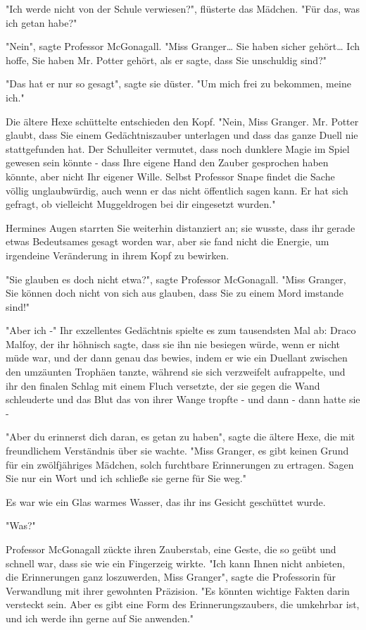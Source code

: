 {"Ich werde nicht von der Schule verwiesen?", flüsterte das Mädchen. "Für das, was ich getan habe?"

"Nein", sagte Professor McGonagall. "Miss Granger… Sie haben sicher gehört… Ich hoffe, Sie haben Mr. Potter gehört, als er sagte, dass Sie unschuldig sind?"

"Das hat er nur so gesagt", sagte sie düster. "Um mich frei zu bekommen, meine ich."

Die ältere Hexe schüttelte entschieden den Kopf. "Nein, Miss Granger. Mr. Potter glaubt, dass Sie einem Gedächtniszauber unterlagen und dass das ganze Duell nie stattgefunden hat. Der Schulleiter vermutet, dass noch dunklere Magie im Spiel gewesen sein könnte - dass Ihre eigene Hand den Zauber gesprochen haben könnte, aber nicht Ihr eigener Wille. Selbst Professor Snape findet die Sache völlig unglaubwürdig, auch wenn er das nicht öffentlich sagen kann. Er hat sich gefragt, ob vielleicht Muggeldrogen bei dir eingesetzt wurden."

Hermines Augen starrten Sie weiterhin distanziert an; sie wusste, dass ihr gerade etwas Bedeutsames gesagt worden war, aber sie fand nicht die Energie, um irgendeine Veränderung in ihrem Kopf zu bewirken.

"Sie glauben es doch nicht etwa?", sagte Professor McGonagall. "Miss Granger, Sie können doch nicht von sich aus glauben, dass Sie zu einem Mord imstande sind!"

"Aber ich -" Ihr exzellentes Gedächtnis spielte es zum tausendsten Mal ab: Draco Malfoy, der ihr höhnisch sagte, dass sie ihn nie besiegen würde, wenn er nicht müde war, und der dann genau das bewies, indem er wie ein Duellant zwischen den umzäunten Trophäen tanzte, während sie sich verzweifelt aufrappelte, und ihr den finalen Schlag mit einem Fluch versetzte, der sie gegen die Wand schleuderte und das Blut das von ihrer Wange tropfte - und dann - dann hatte sie -

"Aber du erinnerst dich daran, es getan zu haben", sagte die ältere Hexe, die mit freundlichem Verständnis über sie wachte. "Miss Granger, es gibt keinen Grund für ein zwölfjähriges Mädchen, solch furchtbare Erinnerungen zu ertragen. Sagen Sie nur ein Wort und ich schließe sie gerne für Sie weg."

Es war wie ein Glas warmes Wasser, das ihr ins Gesicht geschüttet wurde.

"Was?"

Professor McGonagall zückte ihren Zauberstab, eine Geste, die so geübt und schnell war, dass sie wie ein Fingerzeig wirkte. "Ich kann Ihnen nicht anbieten, die Erinnerungen ganz loszuwerden, Miss Granger", sagte die Professorin für Verwandlung mit ihrer gewohnten Präzision. "Es könnten wichtige Fakten darin versteckt sein. Aber es gibt eine Form des Erinnerungszaubers, die umkehrbar ist, und ich werde ihn gerne auf Sie anwenden."

}
